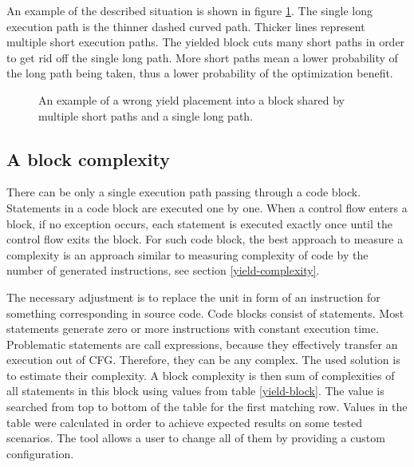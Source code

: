 An example of the described situation is shown in figure \ref{yield-wrong1}. The single long execution path is the thinner dashed curved path. Thicker lines represent multiple short execution paths. The yielded block cuts many short paths in order to get rid off the single long path. More short paths mean a lower probability of the long path being taken, thus a lower probability of the optimization benefit.

\begin{figure}[h!]
\caption{An example of a wrong yield placement into a block shared by multiple short paths and a single long path.}
\label{yield-wrong1}
\centering
\vspace{0.5cm}
\end{figure}

\subsection{A block complexity}
There can be only a single execution path passing through a code block. Statements in a code block are executed one by one. When a control flow enters a block, if no exception occurs, each statement is executed exactly once until the control flow exits the block. For such code block, the best approach to measure a complexity is an approach similar to measuring complexity of code by the number of generated instructions, see section \ref{yield-complexity}.

The necessary adjustment is to replace the unit in form of an instruction for something corresponding in source code. Code blocks consist of statements. Most statements generate zero or more instructions with constant execution time. Problematic statements are call expressions, because they effectively transfer an execution out of CFG. Therefore, they can be any complex. The used solution is to estimate their complexity. A block complexity is then sum of complexities of all statements in this block using values from table \ref{yield-block}. The value is searched from top to bottom of the table for the first matching row. Values in the table were calculated in order to achieve expected results on some tested scenarios. The tool allows a user to change all of them by providing a custom configuration.

